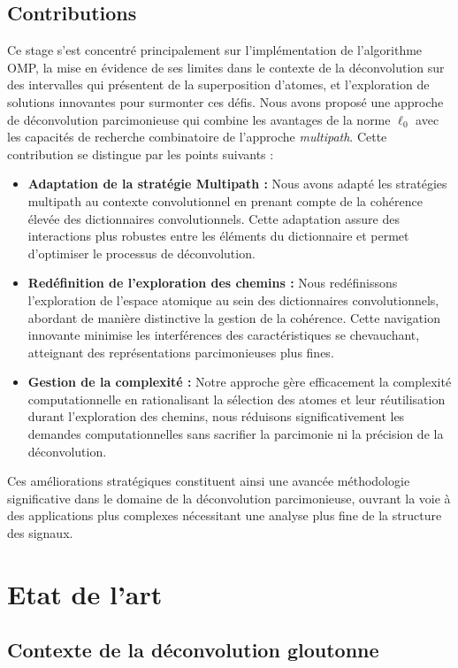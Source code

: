 \documentclass[9pt,a4paper,twoside]{rho}
\begin{document}
\subsection{Contributions}

Ce stage s'est concentré principalement sur l'implémentation de l'algorithme OMP, la mise en évidence de ses limites dans le contexte de la déconvolution sur des intervalles qui présentent de la superposition d'atomes, et l'exploration de solutions innovantes pour surmonter ces défis.
Nous avons proposé une approche de déconvolution parcimonieuse qui combine les avantages de la norme $\ell_0$ avec les capacités de recherche combinatoire de l'approche \textit{multipath}.
Cette contribution se distingue par les points suivants :
\begin{itemize}
    \item \textbf{Adaptation de la stratégie Multipath :} Nous avons adapté les stratégies multipath au contexte convolutionnel en prenant compte de la cohérence élevée des dictionnaires convolutionnels. Cette adaptation assure des interactions plus robustes entre les éléments du dictionnaire et permet d'optimiser le processus de déconvolution.
    \item \textbf{Redéfinition de l'exploration des chemins :} Nous redéfinissons l'exploration de l'espace atomique au sein des dictionnaires convolutionnels, abordant de manière distinctive la gestion de la cohérence. Cette navigation innovante minimise les interférences des caractéristiques se chevauchant, atteignant des représentations parcimonieuses plus fines.
    \item \textbf{Gestion de la complexité :} Notre approche gère efficacement la complexité computationnelle en rationalisant la sélection des atomes et leur réutilisation durant l'exploration des chemins, nous réduisons significativement les demandes computationnelles sans sacrifier la parcimonie ni la précision de la déconvolution.
\end{itemize}
Ces améliorations stratégiques constituent ainsi une avancée méthodologie significative dans le domaine de la déconvolution parcimonieuse, ouvrant la voie à des applications plus complexes nécessitant une analyse plus fine de la structure des signaux.


\section{Etat de l'art}

\subsection{Contexte de la déconvolution gloutonne}
\end{document}
